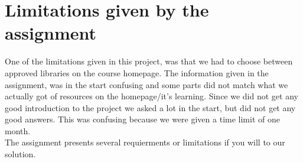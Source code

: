 \chapter{Limitations given by the assignment}

One of the limitations given in this project, was that we had to choose between approved libraries on the course homepage. 
The information given in the assignment, was in the start confusing and some parts did not match what we actually got of resources on the homepage/it’s learning. Since we did not get any good introduction to the project we asked a lot in the start, but did not get any good answers. This was confusing because we were given a time limit of one month. \\

The assignment presents several requierments or limitations if you will to  our solution.

